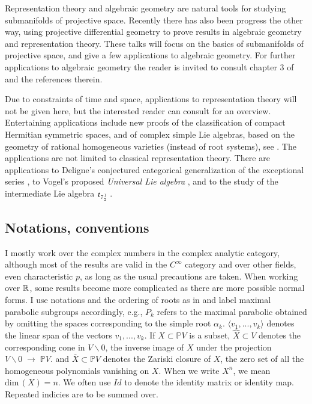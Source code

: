 \documentclass[11pt]{amsart}
\theoremstyle{definition}
\theoremstyle{remark}
\numberwithin{equation}{section}
\def\BP{\mathbb P}
\def\tdim{\rm dim}
\def\hd{,...,}
\def\fe{{\mathfrak e}}
\def\a{\alpha}
\def\ra{{\mathord{\;\rightarrow\;}}}
\def\tdim{\text{dim}\,}
\begin{document}
 


Representation theory and algebraic geometry
are natural tools for studying submanifolds of projective
space. Recently  there has also been progress
the other way, using projective differential geometry
to prove results in algebraic geometry and representation theory. These talks will focus
on the basics of submanifolds of projective
space, and give a few applications to
algebraic geometry. For further applications
to algebraic geometry the reader is invited
to consult chapter 3 of \cite{EDSBK} and the references therein.

Due to constraints of time and space, applications
to representation theory will not be given here,
but the interested reader can consult
\cite{LMpop} for an overview. Entertaining applications
include new proofs of the classification of compact Hermitian
symmetric spaces, and of complex simple Lie algebras, based
on the geometry of rational homogeneous varieties (instead of root systems), see \cite{LM1}.
The  applications are not limited to classical
representation theory.  
There are applications to Deligne's conjectured categorical
generalization of the exceptional series \cite{LMdel}, to Vogel's proposed
{\it Universal Lie algebra} \cite{LMuniv}, and 
to the study of the intermediate Lie algebra $\fe_{7\frac 12}$ \cite{LMsex}.


\subsection*{Notations, conventions} I  mostly work over the
complex numbers in the complex analytic category, although
most of the results are valid in the $C^{\infty}$ category and over other fields, even
characteristic $p$, as long as the usual precautions are
taken. When working over $\mathbb R$, some results become more complicated
as there are more possible normal forms. 
  I use notations and
the ordering of roots as in \cite{bou} and label maximal parabolic
subgroups accordingly, e.g., $P_k$ refers to the maximal parabolic
obtained by omitting the spaces corresponding to the simple
root $\a_k$. $\langle v_1\hd v_k\rangle$ denotes the linear span
of the vectors $v_1\hd v_k$. If $X\subset \BP V$ is a subset,
$\hat X\subset V$ denotes the corresponding cone in $V\backslash 0$,
the inverse image of $X$ under the projection $V\backslash 0\ra \BP V$.
and $\overline X\subset \BP V$ denotes the Zariski closure of $X$,
the zero set of all the homogeneous polynomials vanishing on $X$.
When we write $X^n$, we mean $\tdim (X)=n$.
We often use $Id$ to denote the identity matrix or identity map.
Repeated indicies are to be summed over.
\end{document}
